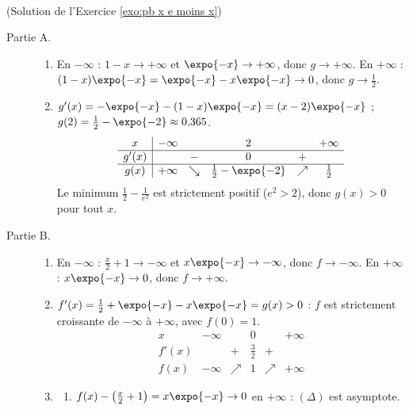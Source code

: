 \begin{corrige}
\begin{sol} ~ \\
(Solution de l'Exercice \ref{exo:pb x e moins x})
\begin{description}
\item[Partie A.] \begin{enumerate}
      \item En $-\infty$ : $1 - x \to +\infty$ et $\expo{-x} \to +\infty$, donc $g \to +\infty$.
            En $+\infty$ : $(1 - x)\expo{-x} = \expo{-x} - x\expo{-x} \to 0$, donc $g \to \frac{1}{2}$.
      \item $g'(x) = -\expo{-x} - (1 - x)\expo{-x} = (x - 2)\expo{-x}$ ; $g(2) = \frac{1}{2} - \expo{-2} \approx 0{,}365$.
            \[
            \begin{array}{c|ccccc}
            x & -\infty & & 2 & & +\infty \\ \hline
            g'(x) & & - & 0 & + & \\ \hline
            g(x) & +\infty & \searrow & \frac{1}{2} - \expo{-2} & \nearrow & \frac{1}{2}
            \end{array}
            \]
            Le minimum $\frac{1}{2} - \frac{1}{e^2}$ est strictement positif ($e^2 > 2$), donc $g(x) > 0$ pour tout $x$.
      \end{enumerate}
\item[Partie B.] \begin{enumerate}
      \item En $-\infty$ : $\frac{x}{2} + 1 \to -\infty$ et $x\expo{-x} \to -\infty$, donc $f \to -\infty$.
            En $+\infty$ : $x\expo{-x} \to 0$, donc $f \to +\infty$.
      \item $f'(x) = \frac{1}{2} + \expo{-x} - x\expo{-x} = g(x) > 0$ : $f$ est strictement croissante de $-\infty$ \`a $+\infty$, avec $f(0) = 1$.
            \[
            \begin{array}{c|ccccc}
            x & -\infty & & 0 & & +\infty \\ \hline
            f'(x) & & + & \frac{3}{2} & + & \\ \hline
            f(x) & -\infty & \nearrow & 1 & \nearrow & +\infty
            \end{array}
            \]
      \item \begin{enumerate}
            \item $f(x) - \left( \frac{x}{2} + 1 \right) = x\expo{-x} \to 0$ en $+\infty$ : $(\Delta)$ est asymptote.

\end{enumerate}
\end{enumerate}
\end{description}
\end{sol}
\end{corrige}
